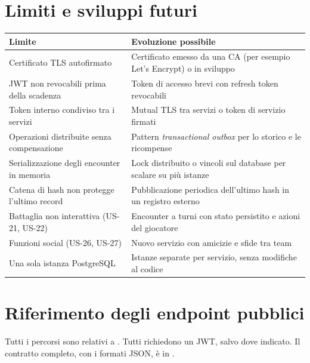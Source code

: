 \documentclass[11pt,a4paper]{report}
\begin{document}
\chapter{Limiti e sviluppi futuri}
\label{sec:future}

\begin{xltabular}{\linewidth}{@{}P{4.2cm}L@{}}
\toprule
\textbf{Limite} & \textbf{Evoluzione possibile} \\
\midrule
\endhead
\bottomrule
\endfoot
Certificato TLS autofirmato & Certificato emesso da una CA (per esempio Let's Encrypt) o  in sviluppo \\
JWT non revocabili prima della scadenza & Token di accesso brevi con refresh token revocabili \\
Token interno condiviso tra i servizi & Mutual TLS tra servizi o token di servizio firmati \\
Operazioni distribuite senza compensazione & Pattern \emph{transactional outbox} per lo storico e le ricompense \\
Serializzazione degli encounter in memoria & Lock distribuito o vincoli sul database per scalare  su più istanze \\
Catena di hash non protegge l'ultimo record & Pubblicazione periodica dell'ultimo hash in un registro esterno \\
Battaglia non interattiva (US-21, US-22) & Encounter a turni con stato persistito e azioni del giocatore \\
Funzioni social (US-26, US-27) & Nuovo servizio  con amicizie e sfide tra team \\
Una sola istanza PostgreSQL & Istanze separate per servizio, senza modifiche al codice \\
\end{xltabular}

\appendix

\chapter{Riferimento degli endpoint pubblici}

Tutti i percorsi sono relativi a . Tutti richiedono un JWT, salvo dove indicato. Il contratto completo, con i formati JSON, è in .
\end{document}
